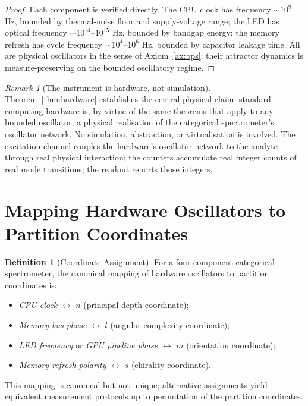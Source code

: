 \documentclass[11pt,a4paper]{article}
\theoremstyle{thmstyle}
\theoremstyle{axiomstyle}
\theoremstyle{definition}
\newtheorem{definition}[theorem]{Definition}
\theoremstyle{remark}
\newtheorem*{remark}{Remark}
\begin{document}
\begin{proof}
Each component is verified directly. The CPU clock has frequency $\sim 10^{9}$ Hz, bounded by thermal-noise floor and supply-voltage range; the LED has optical frequency $\sim 10^{14}$--$10^{15}$ Hz, bounded by bandgap energy; the memory refresh has cycle frequency $\sim 10^{4}$--$10^{6}$ Hz, bounded by capacitor leakage time. All are physical oscillators in the sense of Axiom~\ref{ax:bps}; their attractor dynamics is measure-preserving on the bounded oscillatory regime.
\end{proof}

\begin{remark}[The instrument is hardware, not simulation]
Theorem~\ref{thm:hardware} establishes the central physical claim: standard computing hardware is, by virtue of the same theorems that apply to any bounded oscillator, a physical realisation of the categorical spectrometer's oscillator network. No simulation, abstraction, or virtualisation is involved. The excitation channel couples the hardware's oscillator network to the analyte through real physical interaction; the counters accumulate real integer counts of real mode transitions; the readout reports those integers.
\end{remark}

\section{Mapping Hardware Oscillators to Partition Coordinates}
\label{sec:mapping}

\begin{definition}[Coordinate Assignment]\label{def:assignment}
For a four-component categorical spectrometer, the canonical mapping of hardware oscillators to partition coordinates is:
\begin{itemize}[nosep]
\item \emph{CPU clock} $\leftrightarrow$ $n$ (principal depth coordinate);
\item \emph{Memory bus phase} $\leftrightarrow$ $l$ (angular complexity coordinate);
\item \emph{LED frequency} or \emph{GPU pipeline phase} $\leftrightarrow$ $m$ (orientation coordinate);
\item \emph{Memory refresh polarity} $\leftrightarrow$ $s$ (chirality coordinate).
\end{itemize}
This mapping is canonical but not unique; alternative assignments yield equivalent measurement protocols up to permutation of the partition coordinates.
\end{definition}
\end{document}
